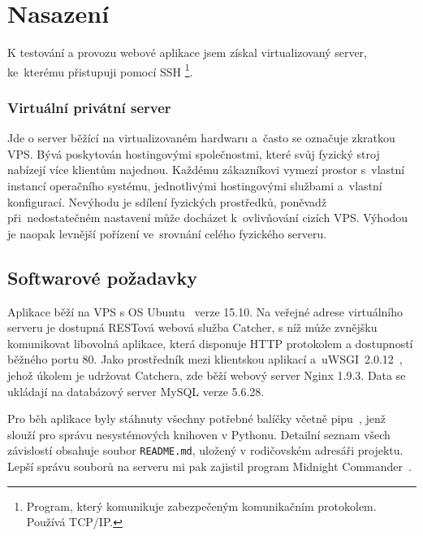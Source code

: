 \chapter{Nasazení}

K testování a provozu webové aplikace jsem získal virtualizovaný server, ke~kterému přistupuji pomocí SSH
\footnote{Program, který komunikuje zabezpečeným komunikačním protokolem. Používá TCP/IP.}.

\subsection*{Virtuální privátní server}

Jde o server běžící na virtualizovaném hardwaru a~často se označuje zkratkou VPS.
Bývá poskytován hostingovými společnostmi, které svůj fyzický stroj nabízejí více klientům najednou.
Každému zákazníkovi vymezí prostor s~vlastní instancí operačního systému, jednotlivými hostingovými službami
a~vlastní konfigurací. Nevýhodu je sdílení fyzických prostředků, poněvadž při~nedostatečném nastavení
může docházet k~ovlivňování cizích VPS. Výhodou je naopak levnější pořízení ve~srovnání celého fyzického serveru.

\section{Softwarové požadavky}

Aplikace běží na VPS s OS Ubuntu~\cite{ubuntu} verze 15.10. Na veřejné adrese virtuálního serveru
je dostupná RESTová webová služba Catcher, s níž může zvnějšku komunikovat libovolná aplikace,
která disponuje HTTP protokolem a dostupností běžného portu 80. Jako prostředník mezi klientskou aplikací
a~uWSGI~2.0.12~\cite{python_uwsgi}, jehož úkolem je udržovat Catchera, zde běží webový server Nginx 1.9.3.
Data se ukládají na databázový server MySQL verze 5.6.28.

Pro běh aplikace byly stáhnuty všechny potřebné balíčky včetně pipu~\cite{python_pip},
jenž slouží pro správu nesystémových knihoven v Pythonu. Detailní seznam všech závislostí obsahuje soubor
\texttt{README.md}, uložený v rodičovském adresáři projektu. Lepší správu souborů na serveru mi pak zajistil program Midnight Commander~\cite{mc}.

